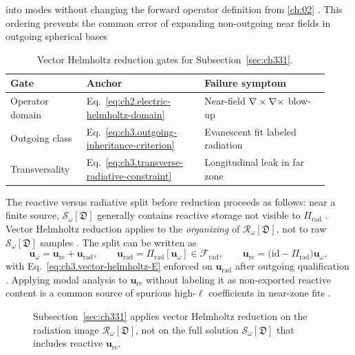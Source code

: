 into modes without changing the forward operator definition from \ref{ch:02} . This
ordering prevents the common error of expanding non-outgoing near fields in outgoing spherical bases
\begin{table}[t]
\centering
\caption{Vector Helmholtz reduction gates for Subsection~\ref{sec:ch331}.}
\label{tab:ch3.331-helmholtz-gates}
\small
\begin{tabular}{@{}p{0.22\linewidth}p{0.34\linewidth}p{0.36\linewidth}@{}}
\toprule
Gate & Anchor & Failure symptom \\
\midrule
Operator domain &
Eq.~\eqref{eq:ch2.electric-helmholtz-domain} &
Near-field \(\nabla\times\nabla\times\) blow-up \\
\addlinespace
Outgoing class &
Eq.~\eqref{eq:ch3.outgoing-inheritance-criterion} &
Evanescent fit labeled radiation \\
\addlinespace
Transversality &
Eq.~\eqref{eq:ch3.transverse-radiative-constraint} &
Longitudinal leak in far zone \\
\bottomrule
\end{tabular}
\end{table}
The reactive versus radiative split before reduction proceeds as follows: near a finite source, \(\mathcal{S}_\omega[\mathfrak{D}]\) generally contains reactive storage not visible to
\(\Pi_{\mathrm{rad}}\) . Vector Helmholtz reduction applies to the
\emph{organizing} of \(\mathcal{R}_\omega[\mathfrak{D}]\), not to raw \(\mathcal{S}_\omega[\mathfrak{D}]\) samples
. The split can be written as
\begin{equation}
\label{eq:ch3.reactive-radiative-helmholtz-split}
\mathbf{u}_\omega
=
\mathbf{u}_{\mathrm{re}}+\mathbf{u}_{\mathrm{rad}},
\qquad
\mathbf{u}_{\mathrm{rad}}=\Pi_{\mathrm{rad}}[\mathbf{u}_\omega]\in\mathcal{F}_{\mathrm{rad}},
\qquad
\mathbf{u}_{\mathrm{re}}=\big(\mathrm{id}-\Pi_{\mathrm{rad}}\big)\mathbf{u}_\omega,
\end{equation}
with Eq.~\eqref{eq:ch3.vector-helmholtz-E} enforced on \(\mathbf{u}_{\mathrm{rad}}\) after outgoing qualification
. Applying modal analysis to \(\mathbf{u}_{\mathrm{re}}\) without labeling it as non-exported
reactive content is a common source of spurious high-\(\ell\) coefficients in near-zone fits .
\begin{figure}[t]
\centering
{}
\caption{Subsection~\ref{sec:ch331} applies vector Helmholtz reduction on the radiation image
\(\mathcal{R}_\omega[\mathfrak{D}]\), not on the full solution \(\mathcal{S}_\omega[\mathfrak{D}]\) that includes
reactive \(\mathbf{u}_{\mathrm{re}}\).}
\label{fig:ch3.reactive-radiative-helmholtz-split}
\end{figure}

